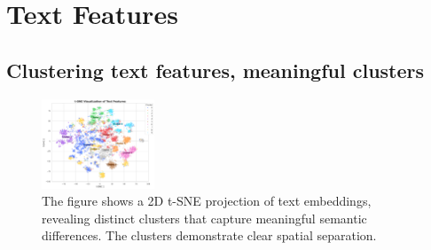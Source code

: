 \documentclass{article}
\begin{document}
\section{Text Features}
\label{sec:text_features}
\subsection{Clustering text features, meaningful clusters}
\begin{figure}[H]
  \centering
  \includegraphics[width=0.3\textwidth]{figures/text_features/text_features_clusters_tsne_10.png}
  \caption{The figure shows a 2D t-SNE projection of text embeddings, revealing distinct clusters that capture meaningful semantic differences. The clusters demonstrate clear spatial separation.}
  \label{fig:text_feat_1}
\end{figure}
\end{document}
